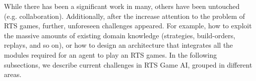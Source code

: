\documentclass[journal]{IEEEtran}
\begin{document}
While there has been a significant work in many, others have been untouched (e.g. collaboration). Additionally, after the increase attention to the problem of RTS games, further, unforeseen challenges appeared. For example, how to exploit the massive amounts of existing domain knowledge (strategies, build-orders, replays, and so on), or how to design an architecture that integrates all the modules required for an agent to play an RTS games. In the following subsections, we describe current challenges in RTS Game AI, grouped in different areas.

\end{document}
